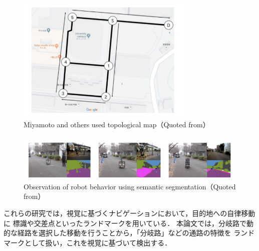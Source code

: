\begin{figure}[h]
    \centering
     \includegraphics[height=60mm]{images/pdf/topo_meiji.pdf}
     \caption[Miyamoto and others used topological map]{Miyamoto and others used topological map（Quoted from\cite{miyamoto}）}
     \label{fig:topo_meiji}
\end{figure}
\begin{figure}[h]
    \centering
     \includegraphics[width=120mm]{images/pdf/seg_meiji.pdf}
     \caption[Observation of robot behavior using semantic segmentation]{Observation of robot behavior using semantic segmentation（Quoted from\cite{miyamoto}）}
     \label{fig:seg_meiji}
\end{figure}


これらの研究では，視覚に基づくナビゲーションにおいて，目的地への自律移動に
標識や交差点といったランドマークを用いている．
本論文では，分岐路で動的な経路を選択した移動を行うことから，「分岐路」などの通路の特徴を
ランドマークとして扱い，これを視覚に基づいて検出する．

